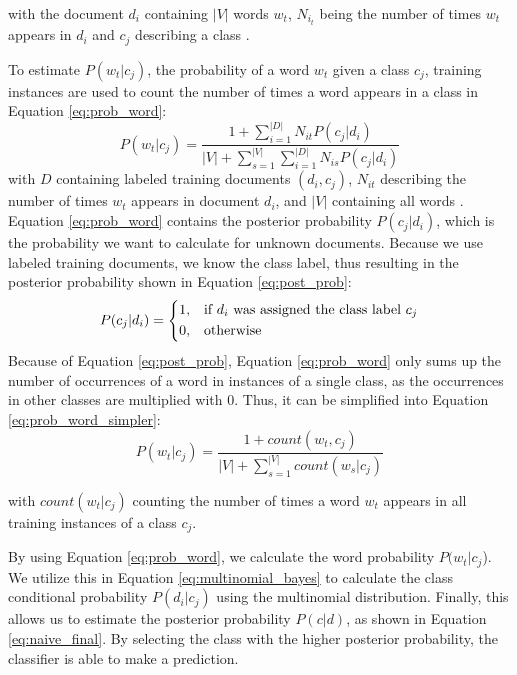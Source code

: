         with the document $d_i$ containing $|V|$ words $w_t$, $N_{i_t}$ being the number of times $w_t$ appears in $d_i$ and $c_j$ describing a class \cite{Mccallum1998}. 
        
        To estimate $P(w_t|c_j)$, the probability of a word $w_t$ given a class $c_j$, training instances are used to count the number of times a word appears in a class in Equation \eqref{eq:prob_word}:
        \begin{equation}
            \label{eq:prob_word}
                P(w_t|c_j) = \frac{1 + \sum_{i=1}^{|D|}N_{it} P(c_j|d_i)}{|V| + \sum_{s=1}^{|V|} \sum_{i=1}^{|D|}N_{is} P (c_j|d_i)} 
        \end{equation}
        with $D$ containing labeled training documents $(d_i,c_j)$, $N_{it}$ describing the number of times $w_t$ appears in document $d_i$, and $|V|$ containing all words \cite{Mccallum1998}.
        Equation \eqref{eq:prob_word} contains the posterior probability $P(c_j|d_i)$, which is the probability we want to calculate for unknown documents. Because we use labeled training documents, we know the class label, thus resulting in the posterior probability shown in Equation \eqref{eq:post_prob}:
        \begin{equation}
                \label{eq:post_prob}
                P(c_j|d_i)= 
                \begin{dcases}
                1,& \text{if } d_i \text{ was assigned the class label } c_j \\
                0,              & \text{otherwise}
        \end{dcases}
        \end{equation}
        Because of Equation \eqref{eq:post_prob}, Equation \eqref{eq:prob_word} only sums up the number of occurrences of a word in instances of a single class, as the occurrences in other classes are multiplied with 0. Thus, it can be simplified into Equation \eqref{eq:prob_word_simpler}:
                \begin{equation}
            \label{eq:prob_word_simpler}
                P(w_t|c_j) = \frac{1 + count(w_t, c_j)}{|V| + \sum_{s=1}^{|V|}count(w_s|c_j)} 
        \end{equation}

        with $count(w_t|c_j)$ counting the number of times a word $w_t$ appears in all training instances of a class $c_j$.
        
        By using Equation \eqref{eq:prob_word}, we calculate the word probability $P(w_t|c_j$). We utilize this in Equation \eqref{eq:multinomial_bayes} to calculate the class conditional probability $P(d_i|c_j)$ using the multinomial distribution. Finally, this allows us to estimate the posterior probability $P(c|d)$, as shown in Equation \eqref{eq:naive_final}. By selecting the class with the higher posterior probability, the classifier is able to make a prediction.
        
